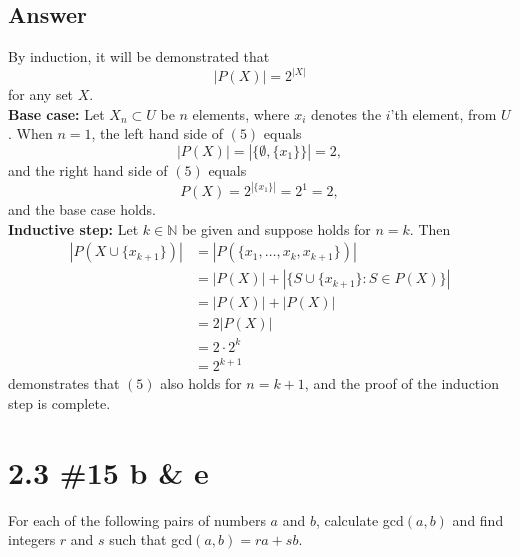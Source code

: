 \documentclass[
	12pt, %
]{fphw}
\newcommand\set[1]{\{#1\}}
\newcommand\qed{\text{$\blacksquare$}}
\newcommand\N{\mathbb{N}}
\begin{document}
\subsection*{Answer} By induction, it will be demonstrated that
\begin{equation}
|P(X)| = 2^{|X|}
\end{equation}
for any set $X$.\\
\textbf{Base case:} Let $X_n \subset U$ be $n$ elements, where $x_i$ denotes the $i$'th element, from $U$. When $n = 1$, the left hand side of $(5)$ equals
$$
| P(X) | = |\set{\emptyset, \set{x_1}}| = 2,
$$
and the right hand side of $(5)$ equals 
$$P(X)=2^{|\set{x_1}|} = 2^1 = 2,$$
and the base case holds.\\
\textbf{Inductive step:}
Let $k \in \N{}$ be given and suppose holds for $n = k$. Then
\begin{align*}
|P(X \cup \set{x_{k + 1}})| &= |P(\set{x_1, \ldots, x_k, x_{k + 1}})|\\
&= | P(X) | + | \set{ S \cup \set{x_{k + 1}} : S  \in P(X)}|\\
&= | P(X) | + | P(X) | \\
&= 2 | P(X) |\\
&= 2 \cdot 2^k\\
&= 2^{k+1}
\end{align*}
demonstrates that $(5)$ also holds for $n = k + 1$, and the proof of the induction step is complete. \qed
\newpage
\section*{2.3 \#15 b \& e}

\begin{problem}
For each of the following pairs of numbers $a$ and $b$, calculate gcd$(a, b)$
and find integers $r$ and $s$ such that gcd$(a, b) = ra + sb$.\end{problem}

\end{document}
